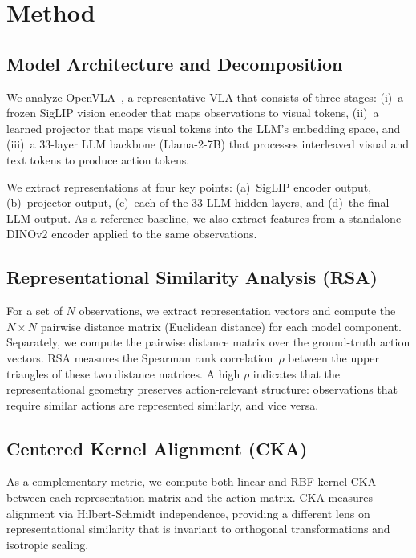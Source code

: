 \documentclass[10pt,letterpaper]{article}
\begin{document}
\section{Method}
\label{sec:method}

\subsection{Model Architecture and Decomposition}

We analyze OpenVLA~\citep{kim2024openvla}, a representative VLA that consists of three stages:
(i)~a frozen SigLIP vision encoder that maps observations to visual tokens,
(ii)~a learned projector that maps visual tokens into the LLM's embedding space, and
(iii)~a 33-layer LLM backbone (Llama-2-7B) that processes interleaved visual and text tokens to produce action tokens.

We extract representations at four key points: (a)~SigLIP encoder output, (b)~projector output, (c)~each of the 33 LLM hidden layers, and (d)~the final LLM output.
As a reference baseline, we also extract features from a standalone DINOv2 encoder applied to the same observations.

\subsection{Representational Similarity Analysis (RSA)}

For a set of $N$ observations, we extract representation vectors and compute the $N{\times}N$ pairwise distance matrix (Euclidean distance) for each model component.
Separately, we compute the pairwise distance matrix over the ground-truth action vectors.
RSA measures the Spearman rank correlation~$\rho$ between the upper triangles of these two distance matrices.
A high $\rho$ indicates that the representational geometry preserves action-relevant structure: observations that require similar actions are represented similarly, and vice versa.

\subsection{Centered Kernel Alignment (CKA)}

As a complementary metric, we compute both linear and RBF-kernel CKA between each representation matrix and the action matrix.
CKA measures alignment via Hilbert-Schmidt independence, providing a different lens on representational similarity that is invariant to orthogonal transformations and isotropic scaling.
\end{document}
